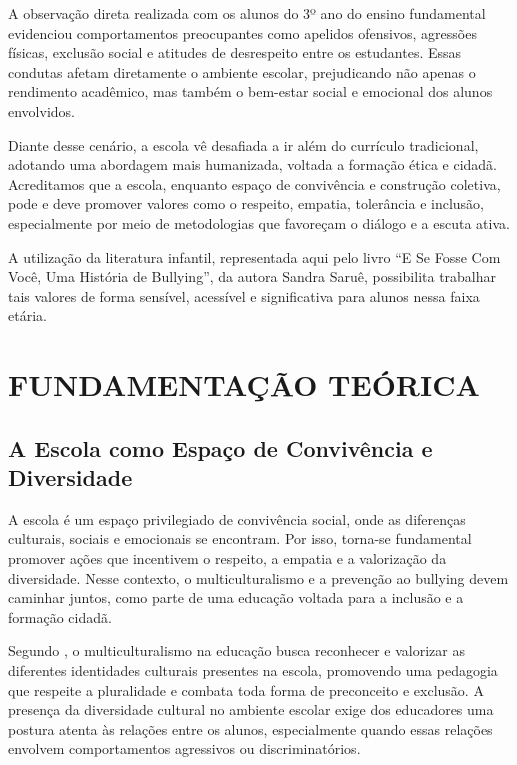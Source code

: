 		A observação direta realizada com os alunos do 3º ano do ensino fundamental evidenciou comportamentos preocupantes como apelidos ofensivos, agressões físicas, exclusão social e atitudes de desrespeito entre os estudantes. Essas condutas afetam diretamente o ambiente escolar, prejudicando não apenas o rendimento acadêmico, mas também o bem-estar social e emocional dos alunos envolvidos.
		
		Diante desse cenário, a escola vê desafiada a ir além do currículo tradicional, adotando uma abordagem mais humanizada, voltada a formação ética e cidadã. Acreditamos que a escola, enquanto espaço de convivência e construção coletiva, pode e deve promover valores como o respeito, empatia, tolerância e inclusão, especialmente por meio de metodologias que favoreçam o diálogo e a escuta ativa.
		
		A utilização da literatura infantil, representada aqui pelo livro “E Se Fosse Com Você, Uma História de Bullying”, da autora Sandra Saruê, possibilita trabalhar tais valores de forma sensível, acessível e significativa para alunos nessa faixa etária. 
	
	
	\section{FUNDAMENTAÇÃO TEÓRICA}
	
		\subsection{A Escola como Espaço de Convivência e Diversidade}
			
			A escola é um espaço privilegiado de convivência social, onde as diferenças culturais, sociais e emocionais se encontram. Por isso, torna-se fundamental promover ações que incentivem o respeito, a empatia e a valorização da diversidade. Nesse contexto, o multiculturalismo e a prevenção ao bullying devem caminhar juntos, como parte de uma educação voltada para a inclusão e a formação cidadã.
			
			Segundo , o multiculturalismo na educação busca reconhecer e valorizar as diferentes identidades culturais presentes na escola, promovendo uma pedagogia que respeite a pluralidade e combata toda forma de preconceito e exclusão. A presença da diversidade cultural no ambiente escolar exige dos educadores uma postura atenta às relações entre os alunos, especialmente quando essas relações envolvem comportamentos agressivos ou discriminatórios.
		
